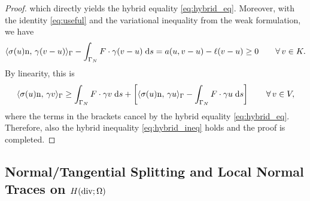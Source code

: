 \begin{proof}
	which directly yields the hybrid equality \eqref{eq:hybrid_eq}. Moreover, with the identity \eqref{eq:useful} and the variational inequality from the weak formulation, we have
	\begin{equation*}
		\langle\sigma(u)\mathrm{n},\,\gamma(v-u)\rangle_\Gamma -\int_{\Gamma_N} F\cdot\gamma(v-u)\;{{\mathrm{d}} s}  = a(u,v-u)-\ell(v-u)\ge 0\qquad\forall\,v\in K.
	\end{equation*}
	By linearity, this is
	\begin{equation*}
		\langle\sigma(u)\mathrm{n},\,\gamma v\rangle_\Gamma\ge \int_{\Gamma_N}F\cdot \gamma v\;{{\mathrm{d}} s} + \left[\langle\sigma(u)\mathrm{n},\,\gamma u\rangle_\Gamma-\int_{\Gamma_N}F\cdot\gamma u\;{{\mathrm{d}} s}\right]\qquad \forall\,v\in V,
	\end{equation*}
	where the terms in the brackets cancel by the hybrid equality \eqref{eq:hybrid_eq}. Therefore, also the hybrid inequality \eqref{eq:hybrid_ineq} holds and the proof is completed.
\end{proof}

\subsection{Normal/Tangential Splitting and Local Normal Traces on \texorpdfstring{$H(\diver;\Omega)$}{Hdiv}}

